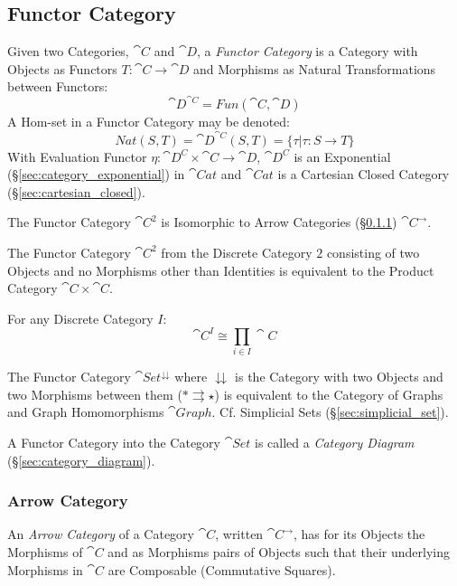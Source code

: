 \subsection{Functor Category}\label{sec:functor_category}

Given two Categories, $\cat{C}$ and $\cat{D}$, a \emph{Functor
  Category} is a Category with Objects as Functors $T : \cat{C}
\rightarrow \cat{D}$ and Morphisms as Natural Transformations
between Functors:
\[
  \cat{D}^{\cat{C}} = Fun(\cat{C},\cat{D})
\]
A Hom-set in a Functor Category may be denoted:
\[
  Nat(S,T) = \cat{D}^{\cat{C}}(S,T) =
    \{ \tau | \tau : S \rightarrow T \}
\]
With Evaluation Functor $\eta : \cat{D^C} \times \cat{C}
\rightarrow \cat{D}$, $\cat{D^C}$ is an Exponential
(\S\ref{sec:category_exponential}) in $\cat{Cat}$ and
$\cat{Cat}$ is a Cartesian Closed Category
(\S\ref{sec:cartesian_closed}).

The Functor Category $\cat{C^2}$ is Isomorphic to Arrow Categories
(\S\ref{sec:arrow_category}) $\cat{C}^\rightarrow$.

The Functor Category $\cat{C}^\mathrm{2}$ from the Discrete
Category $\mathrm{2}$ consisting of two Objects and no Morphisms other
than Identities is equivalent to the Product Category $\cat{C}
\times \cat{C}$.

For any Discrete Category $I$:
\[
  \cat{C}^I \cong \prod_{i \in I} \cat{C}
\]

The Functor Category $\cat{Set}^\downdownarrows$ where
$\downdownarrows$ is the Category with two Objects and two Morphisms
between them ($* \rightrightarrows \star$) is equivalent to the
Category of Graphs and Graph Homomorphisms $\cat{Graph}$. Cf.
Simplicial Sets (\S\ref{sec:simplicial_set}).

A Functor Category into the Category $\cat{Set}$ is called a
\emph{Category Diagram} (\S\ref{sec:category_diagram}).



\subsubsection{Arrow Category}\label{sec:arrow_category}

An \emph{Arrow Category} of a Category $\cat{C}$, written
$\cat{C^{\rightarrow}}$, has for its Objects the Morphisms of
$\cat{C}$ and as Morphisms pairs of Objects such that their
underlying Morphisms in $\cat{C}$ are Composable (Commutative
Squares).

